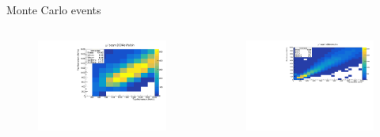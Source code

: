 \documentclass[11pt]{beamer}
\begin{document}
\begin{frame}{Monte Carlo events}
\begin{columns}[T]
\begin{column}{.48\textwidth}
\begin{figure}[h!]
				\includegraphics[width=\textwidth]{MomentumMuonBeamZoom.pdf}
		\end{figure}
	\end{column}%
	\begin{column}{.48\textwidth}
		\begin{figure}[h!]
			\centering
			\includegraphics[width=\textwidth]{MomentumAntiMuonBeam.pdf}
			

\end{figure}
\end{column}
\end{columns}
\end{frame}
\end{document}
